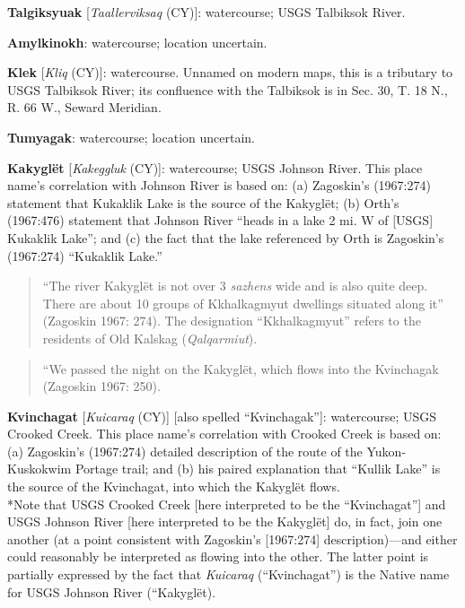 \begin{hang}

\textbf{Talgiksyuak} [\textit{Taallerviksaq} (CY)]: watercourse; USGS Talbiksok River.



\textbf{Amylkinokh}: watercourse; location uncertain.



\textbf{Klek} [\textit{Kliq} (CY)]: watercourse. Unnamed on modern maps, this is a tributary to USGS Talbiksok River; its confluence with the Talbiksok is in Sec. 30, T. 18 N., R. 66 W., Seward Meridian.



\textbf{Tumyagak}: watercourse; location uncertain.



\textbf{Kakyglët} [\textit{Kakeggluk} (CY)]: watercourse; USGS Johnson River. This place name’s correlation with Johnson River is based on: (a) Zagoskin’s (1967:274) statement that Kukaklik Lake is the source of the Kakyglët; (b) Orth’s (1967:476) statement that Johnson River “heads in a lake 2 mi. W of [USGS] Kukaklik Lake”; and (c) the fact that the lake referenced by Orth is Zagoskin’s (1967:274) “Kukaklik Lake.”



\begin{quote}
    “The river Kakyglët is not over 3 \textit{sazhens} wide and is also quite deep. There are about 10 groups of Kkhalkagmyut dwellings situated along it” (Zagoskin 1967: 274). The designation “Kkhalkagmyut” refers to the residents of Old Kalskag (\textit{Qalqarmiut}).
\end{quote}


\begin{quote}
“We passed the night on the Kakyglët, which flows into the Kvinchagak (Zagoskin 1967: 250).
\end{quote}


\textbf{Kvinchagat} [\textit{Kuicaraq} (CY)] [also spelled “Kvinchagak”]: watercourse; USGS Crooked Creek. This place name’s correlation with Crooked Creek is based on: (a) Zagoskin’s (1967:274) detailed description of the route of the Yukon-Kuskokwim Portage trail; and (b) his paired explanation that “Kullik Lake” is the source of the Kvinchagat, into which the Kakyglët flows.\\

{\setlength{\parindent}{0em}
*Note that USGS Crooked Creek [here interpreted to be the “Kvinchagat”] and USGS Johnson River [here interpreted to be the Kakyglët] do, in fact, join one another (at a point consistent with Zagoskin’s [1967:274] description)—and either could reasonably be interpreted as flowing into the other. The latter point is partially expressed by the fact that \textit{Kuicaraq} (“Kvinchagat”) is the Native name for USGS Johnson River (“Kakyglët).
}



\end{hang}
